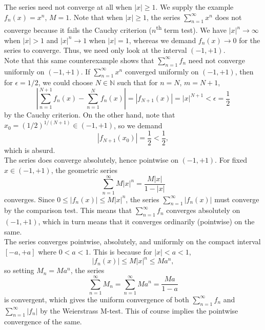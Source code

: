 \documentclass[10pt]{article}
\def\N{\mathbb{N}}
\begin{document}
    The series need not converge at all when $|x| \geq 1$. We supply the example
    $f_n(x) = x^n$, $M = 1$. Note that when $|x| \geq 1$, the series $\sum_{n =
    1}^\infty x^n$ does not converge because it fails the Cauchy criterion
    ($n$\textsuperscript{th} term test). We have $|x|^n \to \infty$ when $|x| > 1$
    and $|x|^n \to 1$ when $|x| = 1$, whereas we demand $f_n(x) \to 0$ for the
    series to converge. Thus, we need only look at the interval $(-1, +1)$. \\

    Note that this same counterexample shows that $\sum_{n = 1}^\infty f_n$ need not
    converge uniformly on $(-1, +1)$. If $\sum_{n = 1}^\infty x^n$
    converged uniformly on $(-1, +1)$, then for $\epsilon = 1 /2$, we could choose
    $N \in \N$ such that for $n = N$, $m = N + 1$, \[
        \left|\sum_{n = 1}^{N + 1} f_n(x) - \sum_{n = 1}^N f_n(x)\right| = 
        |f_{N + 1}(x)| = |x|^{N + 1} < \epsilon = \frac{1}{2}
    \] by the Cauchy criterion. On the other hand, note that $x_0 = 
    (1 / 2)^{1 / (N + 1)} \in (-1, +1)$, so we demand \[
        |f_{N + 1}(x_0)| = \frac{1}{2} < \frac{1}{2},
    \] which is absurd. \\

    The series does converge absolutely, hence pointwise on $(-1, +1)$. For fixed $x
    \in (-1, +1)$, the geometric series \[
        \sum_{n = 1}^\infty M|x|^n = \frac{M|x|}{1 - |x|}
    \] converges. Since $0 \leq |f_n(x)| \leq M|x|^n$, the series $\sum_{n =
    1}^\infty |f_n(x)|$ must converge by the comparison test. This means that
    $\sum_{n = 1}^\infty f_n$ converges absolutely on $(-1, +1)$, which in turn
    means that it converges ordinarily (pointwise) on the same. \\

    The series converges pointwise, absolutely, and uniformly on the compact
    interval $[-a, +a]$ where $0 < a < 1$. This is because for $|x| < a < 1$, \[
        |f_n(x)| \leq M|x|^n \leq Ma^n,
    \] so setting $M_n = Ma^n$, the series \[   
        \sum_{n = 1}^\infty  M_n = \sum_{n = 1}^\infty Ma^n = \frac{Ma}{1 - a}
    \] is convergent, which gives the uniform convergence of both $\sum_{n =
    1}^\infty f_n$ and $\sum_{n = 1}^\infty |f_n|$ by the Weierstrass M-test. This
    of course implies the pointwise convergence of the same. \\
\end{document}
